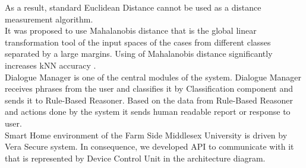 \documentclass{llncs}
\begin{document}
    As a result, standard Euclidean Distance cannot be used as a distance measurement algorithm.\\
    It was proposed to use Mahalanobis distance that is the global linear transformation tool of the input spaces of the cases from different classes separated by a large margins.
    Using of Mahalanobis distance significantly increases kNN accuracy \cite{17}.\\
    Dialogue Manager is one of the central modules of the system.
    Dialogue Manager receives phrases from the user and classifies it by Classification component and sends it to Rule-Based Reasoner.
    Based on the data from Rule-Based Reasoner and actions done by the system it sends human readable report or response to user.\\
    Smart Home environment of the Farm Side Middlesex University is driven by Vera Secure system.
    In consequence, we developed API to communicate with it that is represented by Device Control Unit in the architecture diagram.
\end{document}
